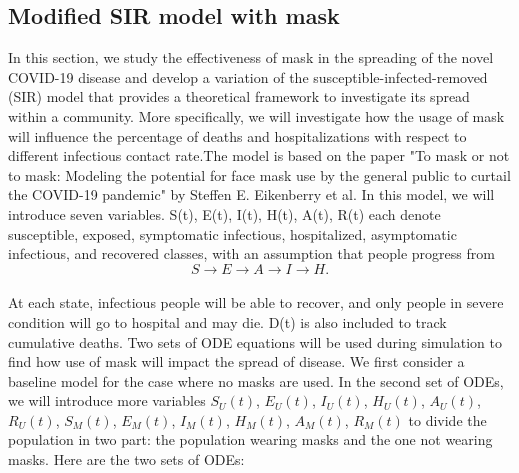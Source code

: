 \documentclass{article}
\begin{document}
\subsection{Modified SIR model with mask}
In this section, we study the effectiveness of mask in the spreading of the novel COVID-19 disease and develop a variation of the susceptible-infected-removed (SIR) model that provides a theoretical framework to investigate its spread within a community. More specifically, we will investigate how the usage of mask will influence the percentage of deaths and hospitalizations with respect to different infectious contact rate.The model is based on the paper "To mask or not to mask: Modeling the potential for face mask use by the general public to curtail the COVID-19 pandemic" by Steffen E. Eikenberry et al. In this model, we will introduce seven variables. S(t), E(t), I(t), H(t), A(t), R(t) each denote susceptible, exposed, symptomatic infectious, hospitalized, asymptomatic infectious, and recovered classes, with an assumption that people progress from \\
$$S \rightarrow E \rightarrow A \rightarrow I \rightarrow H. $$ \\
At each state, infectious people will be able to recover, and only people in severe condition will go to hospital and may die. D(t) is also included to track cumulative deaths. Two sets of ODE equations will be used during simulation to find how use of mask will impact the spread of disease. We first consider a baseline model for the case where no masks are used. In the second set of ODEs, we will introduce more variables
$S_{U}(t)$, $E_{U}(t)$, $I_{U}(t)$, $H_{U}(t)$, $A_{U}(t)$, $R_{U}(t)$, $S_{M}(t)$, $E_{M}(t)$, $I_{M}(t)$, $H_{M}(t)$, $A_{M}(t)$, $R_{M}(t)$ to divide the population in two part: the population wearing masks and the one not wearing masks.
Here are the two sets of ODEs:\\
\end{document}
